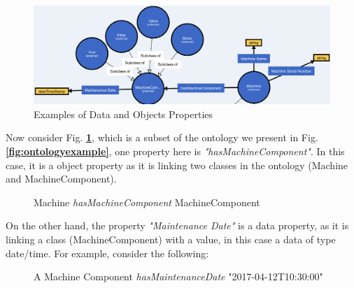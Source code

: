 \documentclass{guideline/sty/rapport}
\begin{document}
  \begin{figure}[H]
        \centering
          \includegraphics[width=\textwidth]{images/properties.png}
          \caption{Examples of Data and Objects Properties}
    \label{fig:exampleproperties}
    \end{figure}

Now consider Fig. \textbf{\ref{fig:exampleproperties}}, which is a subset of the ontology we present in Fig. \textbf{\ref{fig:ontologyexample}}, one property here is \textit{"hasMachineComponent"}. In this case, it is a object property as it is linking two classes in the ontology (Machine and MachineComponent).
    
 \begin{SampleEnv}
    \begin{figure}[H]
    \begin{mdframed}[backgroundcolor=mediumtealblue!8, linecolor=mediumtealblue]
        \begin{minipage}[t]{1\linewidth}
        Machine \textit{hasMachineComponent} MachineComponent
        \end{minipage}
     \end{mdframed}
    \end{figure}
    \label{fig:exampleOBJECTPropertytext}
    \end{SampleEnv}
    
\newpage
On the other hand, the property \textit{"Maintenance Date"} is a data property, as it is linking a class (MachineComponent) with a value, in this case a data of type date/time. For example, consider the following:

 \begin{SampleEnv}
    \begin{figure}[H]
    \begin{mdframed}[backgroundcolor=mediumtealblue!8, linecolor=mediumtealblue]
        \begin{minipage}[t]{1\linewidth}
        A Machine Component \textit{hasMaintenanceDate} "2017-04-12T10:30:00"
        \end{minipage}
     \end{mdframed}
    \end{figure}
    \label{fig:exampleDataPropertyText}
    \end{SampleEnv}
\end{document}
